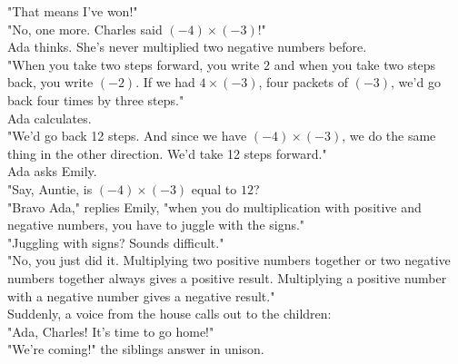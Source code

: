 "That means I've won!"\\
"No, one more. Charles said $(-4) \times (-3)$!"\\
Ada thinks. She's never multiplied two negative numbers before.\\
"When you take two steps forward, you write $2$ and when you take two steps back, you write $(-2)$. If we had $4 \times (-3)$, four packets of $(-3)$, we'd go back four times by three steps."\\
Ada calculates. \\
"We'd go back 12 steps. And since we have $(-4) \times (-3)$, we do the same thing in the other direction. We'd take 12 steps forward."\\
Ada asks Emily.\\
"Say, Auntie, is $(-4) \times (-3)$ equal to $12$?\\
"Bravo Ada," replies Emily, "when you do multiplication with positive and negative numbers, you have to juggle with the signs."\\
"Juggling with signs? Sounds difficult."\\
"No, you just did it. Multiplying two positive numbers together or two negative numbers together always gives a positive result. Multiplying a positive number with a negative number gives a negative result."\\
Suddenly, a voice from the house calls out to the children:\\
"Ada, Charles! It's time to go home!"\\
"We're coming!" the siblings answer in unison.